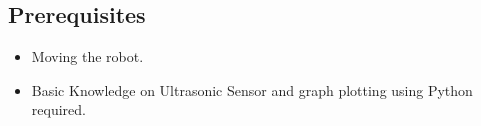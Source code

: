 



\subsection*{\Large Prerequisites}
    \begin{itemize}
    \item Moving the robot. 
        \item  Basic Knowledge on Ultrasonic Sensor and graph plotting using Python required.
    \end{itemize}

